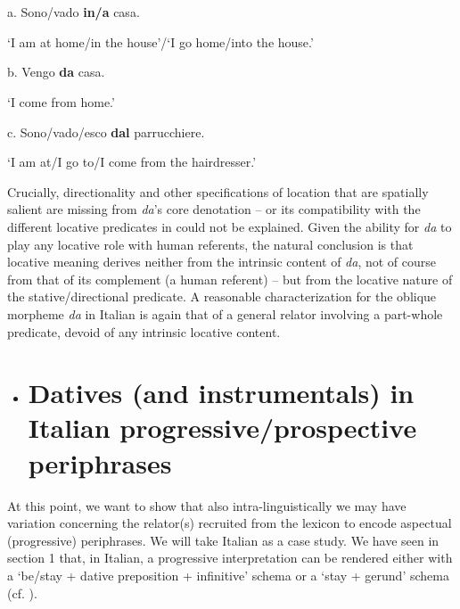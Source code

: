 \documentclass[output=paper,colorlinks,citecolor=brown]{./langscibook}
\begin{document}
\ea%
    \label{ex:key:20}
    \gll\\
        \\
    \glt
    \z

           a.   Sono/vado   \textbf{in/a}   casa.  

‘I am at home/in the house’/‘I go home/into the house.’ 

b.   Vengo \textbf{da}   casa. 

‘I come from home.’ 

c.   Sono/vado/esco \textbf{dal} parrucchiere. 

‘I am at/I go to/I come from the hairdresser.’

Crucially, directionality and other specifications of location that are spatially salient are missing from \textit{da}’s core denotation – or its compatibility with the different locative predicates in  could not be explained. Given the ability for \textit{da} to play any locative role with human referents, the natural conclusion is that locative meaning derives neither from the intrinsic content of \textit{da}, not of course from that of its complement (a human referent) – but from the locative nature of the stative/directional predicate. A reasonable characterization for the oblique morpheme \textit{da} in Italian is again that of a general relator involving a part-whole predicate, devoid of any intrinsic locative content.
 

\begin{itemize}
\item \section{Datives (and instrumentals) in Italian progressive/prospective periphrases}
\end{itemize}

At this point, we want to show that also intra-linguistically we may have variation concerning the relator(s) recruited from the lexicon to encode aspectual (progressive) periphrases. We will take Italian as a case study. We have seen in section 1 that, in Italian, a progressive interpretation can be rendered either with a ‘be/stay + dative preposition + infinitive’ schema  or a ‘stay + gerund’  schema (cf. \citealt{Bertinetto2000}). 
\end{document}
